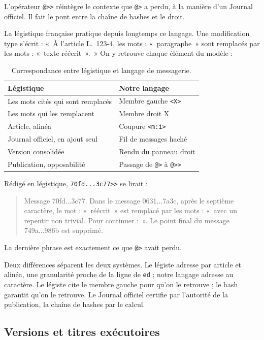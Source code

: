 \documentclass[11pt,a4paper]{article}
\newcommand{\cd}[1]{\texttt{#1}}
\begin{document}
L'opérateur \cd{@>{}>} réintègre le contexte que \cd{@>} a perdu, à la manière d'un Journal officiel. Il fait le pont entre la chaîne de hashes et le droit.

La légistique française pratique depuis longtemps ce langage. Une modification type s'écrit : «~À l'article L.~123-4, les mots : «~paragraphe~» sont remplacés par les mots : «~texte réécrit~».~» On y retrouve chaque élément du modèle :

\begin{table}[H]
\centering
\begin{tabular}{@{}ll@{}}
\toprule
Légistique & Notre langage \\
\midrule
Les mots cités qui sont remplacés & Membre gauche \cd{<X>} \\
Les mots qui les remplacent & Membre droit X \\
Article, alinéa & Coupure \cd{<m:i>} \\
Journal officiel, en ajout seul & Fil de messages haché \\
Version consolidée & Rendu du panneau droit \\
Publication, opposabilité & Passage de \cd{@>} à \cd{@>{}>} \\
\bottomrule
\end{tabular}
\caption{Correspondance entre légistique et langage de messagerie.}
\end{table}

Rédigé en légistique, \cd{70fd...3c77>{}>} se lirait :

\begin{quote}
Message 70fd...3c77. Dans le message 0631...7a3c, après le septième caractère, le mot : «~réécrit~» est remplacé par les mots : «~avec un repentir non trivial. Pour continuer :~». Le point final du message 749a...986b est supprimé.
\end{quote}

La dernière phrase est exactement ce que \cd{@>} avait perdu.

Deux différences séparent les deux systèmes. Le légiste adresse par article et alinéa, une granularité proche de la ligne de \cd{ed} ; notre langage adresse au caractère. Le légiste cite le membre gauche pour qu'on le retrouve ; le hash garantit qu'on le retrouve. Le Journal officiel certifie par l'autorité de la publication, la chaîne de hashes par le calcul.

\subsection{Versions et titres exécutoires}
\end{document}
